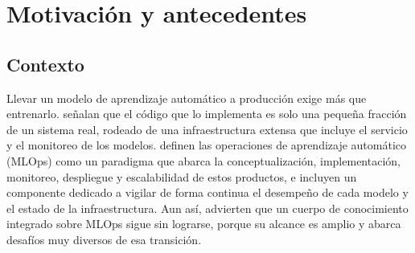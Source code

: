%
%
\chapter{Motivación y antecedentes}\label{cha:motivacion-antecedentes}

\section{Contexto}

Llevar un modelo de aprendizaje automático a producción exige más que entrenarlo. \citet{sculley-hiddentechnicaldebt-2015} señalan que el código que lo implementa es solo una pequeña fracción de un sistema real, rodeado de una infraestructura extensa que incluye el servicio y el monitoreo de los modelos. \citet{kreuzberger-mlopsoverview-2023} definen las operaciones de aprendizaje automático (MLOps) como un paradigma que abarca la conceptualización, implementación, monitoreo, despliegue y escalabilidad de estos productos, e incluyen un componente dedicado a vigilar de forma continua el desempeño de cada modelo y el estado de la infraestructura. Aun así, \citet{eken-mlopsmultivocalreview-2026} advierten que un cuerpo de conocimiento integrado sobre MLOps sigue sin lograrse, porque su alcance es amplio y abarca desafíos muy diversos de esa transición.

